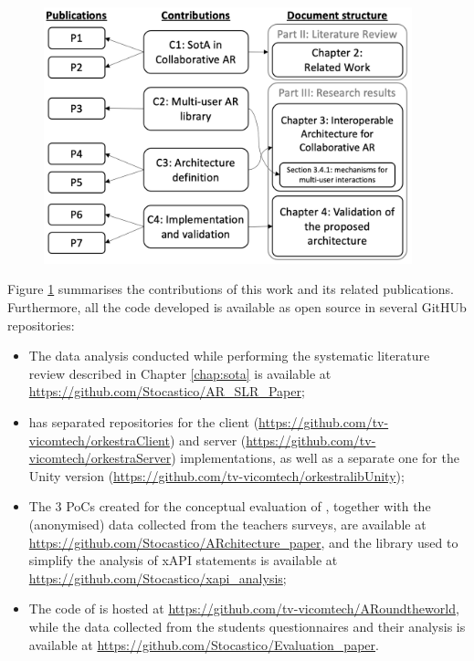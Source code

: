 \begin{figure}[htbp]
    \centering
    \includegraphics[width=0.95\textwidth]{Conclusions/figures/contrib_diagram.png}
    \caption{\fontsize{10pt}{11pt}}
    \label{fig:contribs}
\end{figure}

Figure \ref{fig:contribs} summarises the contributions of this work and its related publications.
Furthermore, all the code developed is available as open source in several GitHUb repositories:

\begin{itemize}
    \item The data analysis conducted while performing the systematic literature review described in Chapter \ref{chap:sota} is available at \url{https://github.com/Stocastico/AR_SLR_Paper};
    \item \ork{} has separated repositories for the client (\url{https://github.com/tv-vicomtech/orkestraClient}) and server (\url{https://github.com/tv-vicomtech/orkestraServer}) implementations, as well as a separate one for the Unity version (\url{https://github.com/tv-vicomtech/orkestralibUnity});
    \item The 3 PoCs created for the conceptual evaluation of \arch{}, together with the (anonymised) data collected from the teachers surveys, are available at \url{https://github.com/Stocastico/ARchitecture_paper}, and the library used to simplify the analysis of xAPI statements is available at \url{https://github.com/Stocastico/xapi_analysis};
    \item The code of \appname{} is hosted at \url{https://github.com/tv-vicomtech/ARoundtheworld}, while the data collected from the students questionnaires and their analysis is available at \url{https://github.com/Stocastico/Evaluation_paper}.
\end{itemize}

